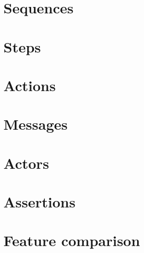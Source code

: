 \section{Sequences}\label{sec:metamodel-sequences}


\section{Steps}\label{sec:metamodel-steps}


\section{Actions}\label{sec:metamodel-actions}


\section{Messages}\label{sec:metamodel-messages}


\section{Actors}\label{sec:metamodel-actors}


\section{Assertions}\label{sec:seq-metamodel-assertions}


\section{Feature comparison}\label{sec:metamodel-features}


